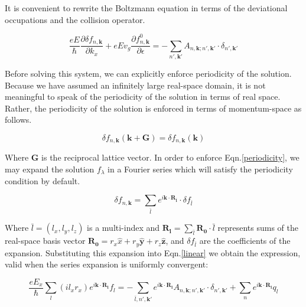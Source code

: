 \documentclass[preprint,12pt]{elsarticle}
\begin{document}
\noindent It is convenient to rewrite the Boltzmann equation in terms of the deviational occupations and the collision operator.

\begin{equation}\label{linear}
    \frac{e E}{\hbar} \frac{\partial \delta f_{n,\mathbf{k}}}{\partial k_x} + e E v_g \frac{\partial f_{n,\mathbf{k}}^0}{\partial \epsilon}= - \sum_{n',\mathbf{k'}} A_{n,\mathbf{k};n',\mathbf{k'}} \cdot \delta_{n',\mathbf{k'}}
\end{equation}

\noindent Before solving this system, we can explicitly enforce periodicity of the solution. Because we have assumed an infinitely large real-space domain, it is not meaningful to speak of the periodicity of the solution in terms of real space. Rather, the periodicity of the solution is enforced in terms of momentum-space as follows.

\begin{equation}\label{periodicity}
\delta f_{n,\mathbf{k}}(\mathbf{k} + \mathbf{G}) = \delta f_{n,\mathbf{k}}(\mathbf{k})
\end{equation}

\noindent Where $\mathbf{G}$ is the reciprocal lattice vector. In order to enforce Eqn.\ref{periodicity}, we may expand the solution $f_{\lambda}$ in a Fourier series which will satisfy the periodicity condition by default. 

\begin{equation}\label{fourier_expansion}
   \delta f_{n,\mathbf{k}} = \sum_{\bar{l}} e^{i \mathbf{k}\cdot \mathbf{R_{\bar{l}}}} \cdot \delta f_{\bar{l}}
\end{equation}

\noindent Where $\bar{l} = (l_x,l_y,l_z)$ is a multi-index and $\mathbf{R_l} = \sum_{\bar{l}} \mathbf{R_0} \cdot \bar{l}$ represents sums of the real-space basis vector $\mathbf{R_0} = r_x \hat{x} + r_y \hat{\mathbf{y}} + r_z \hat{\mathbf{z}}$, and $\delta f_{\bar{l}}$ are the coefficients of the expansion. Substituting this expansion into Eqn.\ref{linear} we obtain the expression, valid when the series expansion is uniformly convergent:

\begin{equation} \label{inserted}
    \frac{e E_x}{\hbar} \sum_{l} (i l_x r_x) e^{i \mathbf{k}\cdot \mathbf{R_l}} f_l = 
    - \sum_{\bar{l},n',\mathbf{k'}} e^{i \mathbf{k}\cdot \mathbf{R_l}} A_{n,\mathbf{k};n',\mathbf{k'}} \cdot \delta_{n',\mathbf{k'}}
    + \sum_n e^{i \mathbf{k}\cdot \mathbf{R_l}} q_l
\end{equation}
\end{document}
